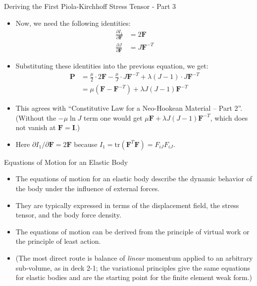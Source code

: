 \documentclass{beamer}
\begin{document}
\begin{frame}{Deriving the First Piola-Kirchhoff Stress Tensor - Part 3}
\begin{itemize}
\item Now, we need the following identities:
\begin{align*}
\frac{\partial I_1}{\partial \mathbf{F}} &= 2 \mathbf{F} \\
\frac{\partial J}{\partial \mathbf{F}} &= J \mathbf{F}^{-T}
\end{align*}
\item Substituting these identities into the previous equation, we get:
\begin{align*}
\mathbf{P} &= \frac{\mu}{2} \cdot 2 \mathbf{F} - \frac{\mu}{J}\cdot J\mathbf{F}^{-T} + \lambda (J - 1) \cdot J \mathbf{F}^{-T} \\
&= \mu (\mathbf{F} - \mathbf{F}^{-T}) + \lambda J (J - 1) \mathbf{F}^{-T}
\end{align*}
\item This agrees with ``Constitutive Law for a Neo-Hookean Material -- Part 2''. (Without the $-\mu\ln J$ term one would get $\mu\mathbf{F} + \lambda J(J-1)\mathbf{F}^{-T}$, which does not vanish at $\mathbf{F}=\mathbf{I}$.)
\item Here $\partial I_1/\partial\mathbf{F} = 2\mathbf{F}$ because $I_1 = \mathrm{tr}(\mathbf{F}^T\mathbf{F}) = F_{iJ}F_{iJ}$.
\end{itemize}
\end{frame}

\begin{frame}{Equations of Motion for an Elastic Body}
    \begin{itemize}
        \item The equations of motion for an elastic body describe the dynamic behavior of the body under the influence of external forces.
        \item They are typically expressed in terms of the displacement field, the stress tensor, and the body force density.
        \item The equations of motion can be derived from the principle of virtual work or the principle of least action.
        \item (The most direct route is balance of \emph{linear} momentum applied to an arbitrary sub-volume, as in deck 2-1; the variational principles give the same equations for elastic bodies and are the starting point for the finite element weak form.)
    \end{itemize}
\end{frame}
\end{document}
